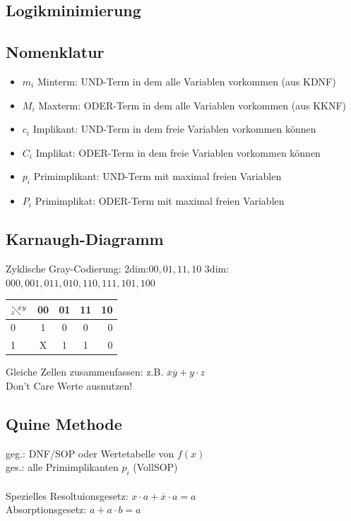 \documentclass[6pt,a4paper]{scrartcl}
\begin{document}
\begin{multicols*}{3}
\section{Logikminimierung}
	\subsection{Nomenklatur}
	\begin{itemize}\itemsep0pt
	\item $m_i$ Minterm: UND-Term in dem alle Variablen vorkommen (aus KDNF)
	\item $M_i$ Maxterm: ODER-Term in dem alle Variablen vorkommen (aus KKNF)
	\item $c_i$ Implikant: UND-Term in dem freie Variablen vorkommen können
	\item $C_i$ Implikat: ODER-Term in dem freie Variablen vorkommen können
	\item $p_i$ Primimplikant: UND-Term mit maximal freien Variablen
	\item $P_i$ Primimplikat: ODER-Term mit maximal freien Variablen
	\end{itemize}

	\subsection{Karnaugh-Diagramm} %
		Zyklische Gray-Codierung: 2dim:$00,01,11,10$ 3dim:$000,001,011,010,110,111,101,100$
		
	\begin{tabular}{l | c | c |  c | r}
	$_z\!\!\diagdown \!\!^{xy}$ & 00 	& 	01	&	11 	&	10	 	\\ \midrule
	0		&	1 \cellcolor{gray}	&	0	&	0	&	0		\\	
	1		&	X \cellcolor{gray}	&	1 \cellcolor{lightgray}	&	1 \cellcolor{lightgray}	&	0		\\	
	\end{tabular}
	Gleiche Zellen zusammenfassen: z.B. $\overline x \overline y + y \cdot z$\\
	Don't Care Werte ausnutzen!

	\subsection{Quine Methode}
	geg.: DNF/SOP oder Wertetabelle von $f(x)$ \\
	ges.: alle Primimplikanten $p_i$ (VollSOP)  \\ \\
	Spezielles Resoltuionsgesetz: $x\cdot a + \overline x \cdot a = a$ \\
	Absorptionsgesetz: $a + a\cdot b = a$
	

\end{multicols*}
\end{document}
